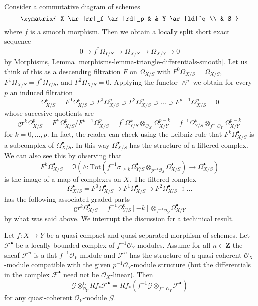 \noindent
Consider a commutative diagram of schemes
$$
\xymatrix{
X \ar[rr]_f \ar[rd]_p & & Y \ar[ld]^q \\
& S
}
$$
where $f$ is a smooth morphism. Then we obtain a locally split short
exact sequence
$$
0 \to f^*\Omega_{Y/S} \to \Omega_{X/S} \to \Omega_{X/Y} \to 0
$$
by Morphisms, Lemma \ref{morphisms-lemma-triangle-differentials-smooth}.
Let us think of this as a descending filtration $F$ on $\Omega_{X/S}$
with $F^0\Omega_{X/S} = \Omega_{X/S}$, $F^1\Omega_{X/S} = f^*\Omega_{Y/S}$, and
$F^2\Omega_{X/S} = 0$. Applying the functor $\wedge^p$ we obtain
for every $p$ an induced filtration
$$
\Omega^p_{X/S} = F^0\Omega^p_{X/S} \supset
F^1\Omega^p_{X/S} \supset
F^2\Omega^p_{X/S} \supset \ldots \supset F^{p + 1}\Omega^p_{X/S} = 0
$$
whose succesive quotients are
$$
\text{gr}^k\Omega^p_{X/S} =
F^k\Omega^p_{X/S}/F^{k + 1}\Omega^p_{X/S} =
f^*\Omega^k_{Y/S} \otimes_{\mathcal{O}_X} \Omega^{p - k}_{X/Y} =
f^{-1}\Omega^k_{Y/S} \otimes_{f^{-1}\mathcal{O}_Y} \Omega^{p - k}_{X/Y}
$$
for $k = 0, \ldots, p$. In fact, the reader can check using the
Leibniz rule that $F^k\Omega^\bullet_{X/S}$ is a subcomplex of
$\Omega^\bullet_{X/S}$. In this way $\Omega^\bullet_{X/S}$ has
the structure of a filtered complex. We can also see this by observing
that
$$
F^k\Omega^\bullet_{X/S} =
\Im\left(\wedge :
\text{Tot}(
f^{-1}\sigma_{\geq k}\Omega^\bullet_{Y/S} \otimes_{p^{-1}\mathcal{O}_S}
\Omega^\bullet_{X/S})
\longrightarrow
\Omega^\bullet_{X/S}\right)
$$
is the image of a map of complexes on $X$. The filtered complex
$$
\Omega^\bullet_{X/S} = F^0\Omega^\bullet_{X/S} \supset
F^1\Omega^\bullet_{X/S} \supset F^2\Omega^\bullet_{X/S} \supset \ldots
$$
has the following associated graded parts
$$
\text{gr}^k\Omega^\bullet_{X/S} = 
f^{-1}\Omega^k_{Y/S}[-k] \otimes_{f^{-1}\mathcal{O}_Y} \Omega^\bullet_{X/Y}
$$
by what was said above. We interrupt the discussion for a techinical
result.

\begin{lemma}
\label{lemma-cohomology-de-rham-base-change}
Let $f : X \to Y$ be a quasi-compact and quasi-separated morphism
of schemes. Let $\mathcal{F}^\bullet$ be a locally bounded complex of
$f^{-1}\mathcal{O}_Y$-modules. Assume for all $n \in \mathbf{Z}$
the sheaf $\mathcal{F}^n$ is a flat $f^{-1}\mathcal{O}_Y$-module and
$\mathcal{F}^n$ has the structure of a quasi-coherent $\mathcal{O}_X$-module
compatible with the given $p^{-1}\mathcal{O}_Y$-module structure (but the
differentials in the complex $\mathcal{F}^\bullet$ need not
be $\mathcal{O}_X$-linear). Then
$$
\mathcal{G} \otimes_{\mathcal{O}_Y}^\mathbf{L} Rf_*\mathcal{F}^\bullet =
Rf_*(f^{-1}\mathcal{G} \otimes_{f^{-1}\mathcal{O}_Y} \mathcal{F}^\bullet)
$$
for any quasi-coherent $\mathcal{O}_Y$-module $\mathcal{G}$.
\end{lemma}

